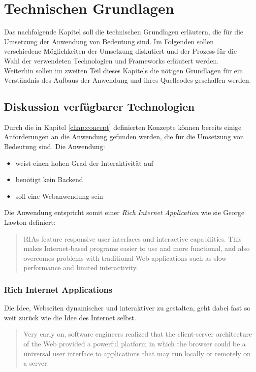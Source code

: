 \chapter{Technischen Grundlagen}
\thispagestyle{fancy}
Das nachfolgende Kapitel soll die technischen Grundlagen erläutern, die für die Umsetzung der Anwendung von Bedeutung sind. Im Folgenden sollen verschiedene Möglichkeiten der Umsetzung diskutiert und der Prozess für die Wahl der verwendeten Technologien und Frameworks erläutert werden.\\
Weiterhin sollen im zweiten Teil dieses Kapitels die nötigen Grundlagen für ein Verständnis des Aufbaus der Anwendung und ihres Quellcodes geschaffen werden.

\section{Diskussion verfügbarer Technologien}
Durch die in Kapitel \ref{chap:concept} definierten Konzepte können bereits einige Anforderungen an die Anwendung gefunden werden, die für die Umsetzung von Bedeutung sind.
Die Anwendung:

\begin{itemize}
  \item weist einen hohen Grad der Interaktivität auf
  \item benötigt kein Backend
  \item soll eine Webanwendung sein
\end{itemize}

Die Anwendung entspricht somit einer \textit{Rich Internet Application} wie sie George Lawton definiert:

\begin{quote}
  RIAs feature responsive user interfaces and interactive capabilities. This makes Internet-based programs easier to use and more functional, and also overcomes problems with traditional Web applications such as slow performance and limited interactivity. \cite{lawton2008new}
\end{quote}

\subsection{Rich Internet Applications}
Die Idee, Webseiten dynamischer und interaktiver zu gestalten, geht dabei fast so weit zurück wie die Idee des Internet selbst.

\begin{quote}
  Very early on, software engineers realized that the client-server architecture of the Web provided a powerful platform in which the browser could be a universal user interface to applications that may run locally or remotely on a server. \cite{Jazayeri:2007:TWA:1253532.1254719}
\end{quote}

